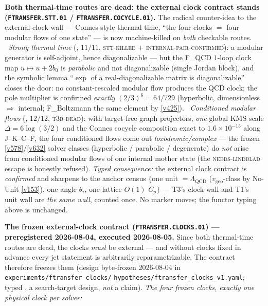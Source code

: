 \documentclass[11pt,a4paper]{article}
\begin{document}
\par\smallskip\noindent\textbf{Both thermal-time routes are dead: the
external clock contract stands (\texttt{FTRANSFER.STT.01} /
\texttt{FTRANSFER.COCYCLE.01}).}  The radical counter-idea to the
external-clock wall --- Connes-style thermal time, ``the four clocks
$=$ four modular flows of one state'' --- is now machine-killed on
\emph{both} checkable routes.  \mX\ \emph{Strong thermal time}
(, $11/11$,
\textsc{stt-killed} $+$ \textsc{internal-pair-confirmed}): a modular
generator is self-adjoint, hence diagonalizable --- but the F\_QCD
$1$-loop clock map $u\mapsto u+2b_0$ is \emph{parabolic} and not
diagonalizable (single Jordan block), and the symbolic lemma
``$\exp$ of a real-diagonalizable matrix is diagonalizable'' closes
the door: no constant-rescaled modular flow produces the QCD clock;
the pole multiplier is confirmed \emph{exactly} $(2/3)^6=64/729$
(hyperbolic, dimensionless $\Rightarrow$ internal; F\_Boltzmann the
same element by \vref{v425}).  \mX\ \emph{Conditioned modular flows}
(, $12/12$,
\textsc{t3b-dead}): with target-free graph projectors, \emph{one}
global KMS scale $\Delta=6\log(3/2)$ and the Connes cocycle
composition exact to $1.6\times10^{-15}$ along J--K--C--F, the four
conditioned flows come out \emph{loxodromic/complex} --- the frozen
\vref{v578}/\vref{v632} solver classes (hyperbolic / parabolic /
degenerate) do \emph{not} arise from conditioned modular flows of
one internal mother state (the \textsc{needs-lindblad} escape is
honestly refused).  \emph{Typed consequence:} the external clock
contract is \emph{confirmed} and sharpens to the anchor census
$\{$one unit $=\Lambda_{\mathrm{QCD}}$
($v_{\mathrm{geo}}$-class by No-Unit \vref{v153}), one angle
$\theta_i$, one lattice $O(1)$ $C_p\}$ --- T3's clock wall and T1's
unit wall are \emph{the same wall}, counted once.  No marker moves;
the functor typing above is unchanged.
\par\smallskip\noindent\textbf{The frozen external-clock contract
(\texttt{FTRANSFER.CLOCKS.01}) --- preregistered 2026-08-04,
executed 2026-08-05.}
Since both thermal-time routes are dead, the clocks \emph{must} be
external --- and without clocks fixed in advance every jet statement
is arbitrarily reparametrizable.  The contract therefore freezes
them (design byte-frozen 2026-08-04 in
\texttt{experiments/ftransfer-clocks/}\allowbreak
\texttt{hypotheses/ftransfer\_clocks\_v1.yaml};
typed \mX, a search-target design, \emph{not} a claim).  \emph{The
four frozen clocks, exactly one physical clock per solver:}
\end{document}
